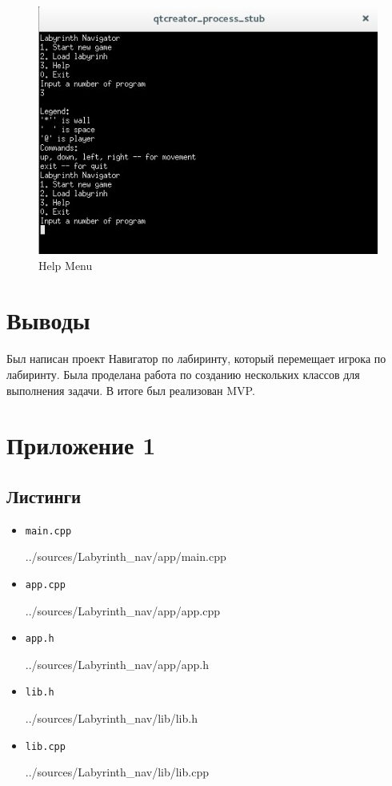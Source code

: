 \documentclass[a4paper]{article}
\begin{document}
\begin{figure}[H]
	\begin{center}
		\includegraphics[scale=0.7]{Screenshot/2.jpg}
		\caption{Help Menu} 
		\label{pic:pic_name} %
	\end{center}
\end{figure}


\section{Выводы}
Был написан проект Навигатор по лабиринту, который перемещает игрока по лабиринту. Была проделана работа по созданию нескольких классов для выполнения задачи. В итоге был реализован MVP.

\section{Приложение 1}

\subsection*{Листинги}

\begin{itemize}

\item[] \verb-main.cpp-

{../sources/Labyrinth_nav/app/main.cpp}
\item[] \verb-app.cpp-

{../sources/Labyrinth_nav/app/app.cpp}
\item[] \verb-app.h-

{../sources/Labyrinth_nav/app/app.h}

\item[] \verb-lib.h-

{../sources/Labyrinth_nav/lib/lib.h}
\item[] \verb-lib.cpp-

{../sources/Labyrinth_nav/lib/lib.cpp}

\end{itemize}
\end{document}
